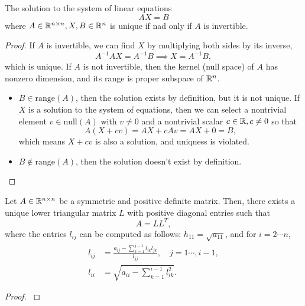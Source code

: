 \begin{theorem}
The solution to the system of linear equations 
\[ AX=B \]
where \(A\in\mathbb{R}^{n\times n}, X,B\in\mathbb{R}^n\) is unique if nad only if $A$ is invertible.
\end{theorem}
\begin{proof}
If $A$ is invertible, we can find $X$ by multiplying both sides by its inverse,
\[ A^{-1}AX=A^{-1}B \implies X=A^{-1}B, \]
which is unique.
If $A$ is not invertible, then the kernel (null space) of $A$ has nonzero dimension, and its range is proper subspace of \(\mathbb{R}^n\).
\begin{itemize}
	\item \(B\in\text{range}(A)\), then the solution exists by definition, but it is not unique.
	If $X$ is a solution to the system of equations, then we can select a nontrivial element \(v\in\text{null}(A)\) with \(v\neq0\) and a nontrivial scalar \(c\in\mathbb{R},c\neq0\) so that
	\[ A(X+cv)=AX+cAv=AX+0=B, \]
	which means \(X+cv\) is also a solution, and uniqness is violated.
	\item \(B\notin\text{range}(A)\), then the solution doesn't exist by definition.
\end{itemize}
\end{proof}


\begin{theorem}
\label{cholesky}
Let \(A\in\mathbb{R}^{n\times n}\) be a symmetric and positive definite matrix.
Then, there exists a unique lower triangular matrix $L$ with positive diagonal entries such that
\[ A=LL^T, \]
where the entries \(l_{ij}\) can be computed as follows: \(h_{11}=\sqrt{a_{11}}\), and for \(i=2\cdots n\),
\begin{align}
l_{ij}&=\frac{a_{ij}-\sum_{k=1}^{j-1}l_{ik}l_{jk}}{l_{jj}}, \quad j=1\cdots,i-1, \label{cho1}\\
l_{ii}&=\sqrt{a_{ii}-\sum_{k=1}^{i-1}l_{ik}^2} \label{cho2}.
\end{align}
\end{theorem}
\begin{proof}


\cite{tam37}
\end{proof}
